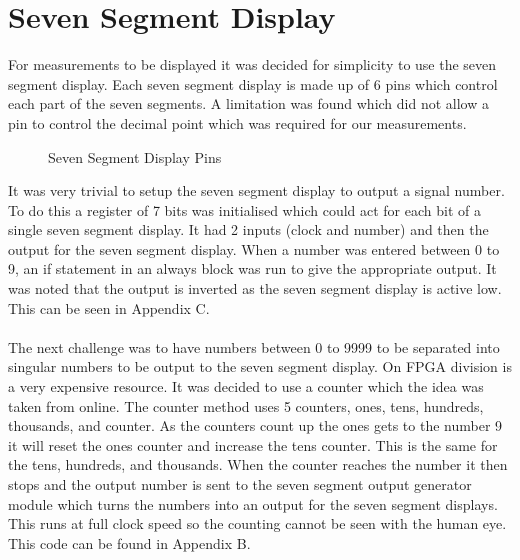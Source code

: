 \documentclass[a4paper,12pt]{article}
\begin{document}
\section{Seven Segment Display}
\begin{flushleft}
For measurements to be displayed it was decided for simplicity to use the seven segment display. Each seven segment display is made up of 6 pins which control each part of the seven segments. A limitation was found which did not allow a pin to control the decimal point which was required for our measurements. 
\begin{figure}[H]
	\centering
	\caption{Seven Segment Display Pins \cite{terasic_2014}}
\end{figure}
It was very trivial to setup the seven segment display to output a signal number. To do this a register of 7 bits was initialised which could act for each bit of a single seven segment display. It had 2 inputs (clock and number) and then the output for the seven segment display. When a number was entered between 0 to 9, an if statement in an always block was run to give the appropriate output. It was noted that the output is inverted as the seven segment display is active low. This can be seen in Appendix C.
\\ \- \\
The next challenge was to have numbers between 0 to 9999 to be separated into singular numbers to be output to the seven segment display. On FPGA division is a very expensive resource. It was decided to use a counter which the idea was taken from online. \cite{stack_overflow} The counter method uses 5 counters, ones, tens, hundreds, thousands, and counter. As the counters count up the ones gets to the number 9 it will reset the ones counter and increase the tens counter. This is the same for the tens, hundreds, and thousands. When the counter reaches the number it then stops and the output number is sent to the seven segment output generator module which turns the numbers into an output for the seven segment displays. This runs at full clock speed so the counting cannot be seen with the human eye. This code can be found in Appendix B.
\end{flushleft}
\newpage
\end{document}
